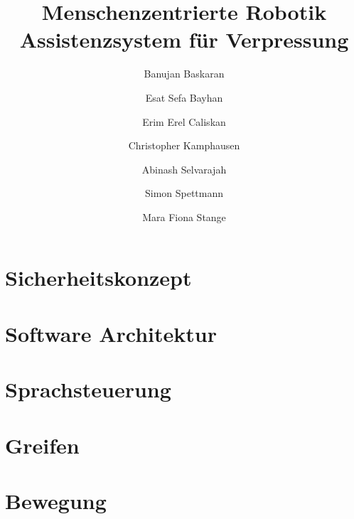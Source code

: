 \documentclass{article}
\title{
    Menschenzentrierte Robotik \\
    Assistenzsystem für Verpressung}
\author{
    Banujan Baskaran \and
    Esat Sefa Bayhan \and
    Erim Erel Caliskan \and
    Christopher Kamphausen \and
    Abinash Selvarajah \and
    Simon Spettmann \and
    Mara Fiona Stange 
}
\begin{document}
\maketitle

\section{Sicherheitskonzept}
\section{Software Architektur}
\section{Sprachsteuerung}
\section{Greifen}
\section{Bewegung}
\end{document}
